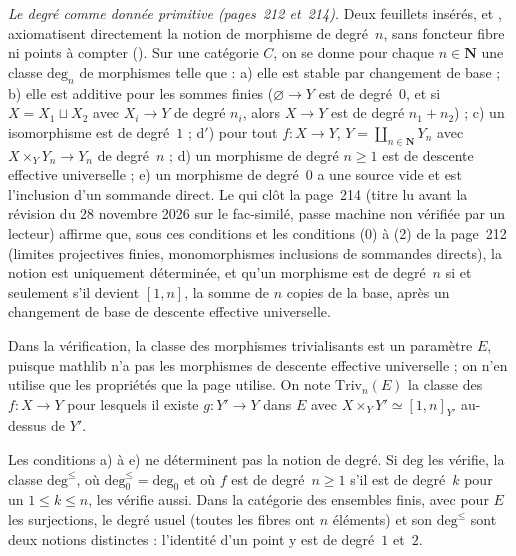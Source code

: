 \noindent\emph{Le degré comme donnée primitive (pages~212 et~214).} Deux feuillets insérés,  et , axiomatisent directement la notion de morphisme de degré~$n$, sans foncteur fibre ni points à compter (). Sur une catégorie $C$, on se donne pour chaque $n \in \mathbf N$ une classe $\mathrm{deg}_n$ de morphismes telle que : a) elle est stable par changement de base ; b) elle est additive pour les sommes finies ($\varnothing \to Y$ est de degré~$0$, et si $X = X_1 \sqcup X_2$ avec $X_i \to Y$ de degré $n_i$, alors $X \to Y$ est de degré $n_1 + n_2$) ; c) un isomorphisme est de degré~$1$ ; d$'$) pour tout $f : X \to Y$, $Y = \coprod_{n \in \mathbf N} Y_n$ avec $X \times_Y Y_n \to Y_n$ de degré~$n$ ; d) un morphisme de degré $n \geq 1$ est de descente effective universelle ; e) un morphisme de degré~$0$ a une source vide et est l'inclusion d'un sommande direct. Le  qui clôt la page~214 (titre lu  avant la révision du 28 novembre 2026 sur le fac-similé, passe machine non vérifiée par un lecteur) affirme que, sous ces conditions et les conditions (0) à (2) de la page~212 (limites projectives finies, monomorphismes inclusions de sommandes directs), la notion est uniquement déterminée, et qu'un morphisme est de degré~$n$ si et seulement s'il devient $[1, n]$, la somme de $n$ copies de la base, après un changement de base de descente effective universelle.

Dans la vérification, la classe des morphismes trivialisants est un paramètre $E$, puisque mathlib n'a pas les morphismes de descente effective universelle ; on n'en utilise que les propriétés que la page utilise. On note $\mathrm{Triv}_n(E)$ la classe des $f : X \to Y$ pour lesquels il existe $g : Y' \to Y$ dans $E$ avec $X \times_Y Y' \simeq [1, n]_{Y'}$ au-dessus de $Y'$.

\begin{encadre}
\begin{contrexemple}
Les conditions a) à e) ne déterminent pas la notion de degré. Si $\mathrm{deg}$ les vérifie, la classe $\mathrm{deg}^{\leq}$, où $\mathrm{deg}^{\leq}_0 = \mathrm{deg}_0$ et où $f$ est de degré~$n \geq 1$ s'il est de degré~$k$ pour un $1 \leq k \leq n$, les vérifie aussi. Dans la catégorie des ensembles finis, avec pour $E$ les surjections, le degré usuel (toutes les fibres ont $n$ éléments) et son $\mathrm{deg}^{\leq}$ sont deux notions distinctes : l'identité d'un point y est de degré~$1$ et~$2$.
\end{contrexemple}
\end{encadre}

